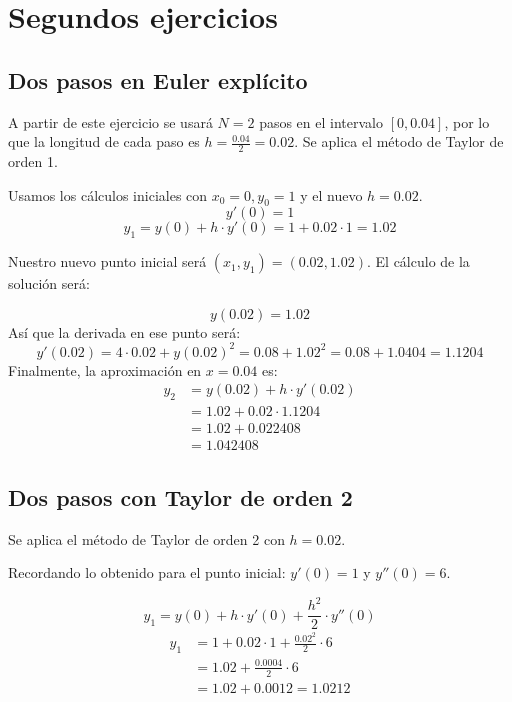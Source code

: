 \documentclass{article}
\begin{document}
\section{Segundos ejercicios}

\subsection{Dos pasos en Euler explícito}

A partir de este ejercicio se usará $N=2$ pasos en el intervalo $[0, 0.04]$, por lo que la longitud de cada paso es $h=\frac{0.04}{2}=0.02$. Se aplica el método de Taylor de orden 1.

Usamos los cálculos iniciales con $x_0=0, y_0=1$ y el nuevo $h=0.02$.
\begin{equation}
y'(0) = 1
\end{equation}
\begin{equation}
y_1 = y(0) + h \cdot y'(0) = 1 + 0.02 \cdot 1 = 1.02
\end{equation}

Nuestro nuevo punto inicial será $(x_1, y_1) = (0.02, 1.02)$. El cálculo de la solución será:


\begin{equation}
y(0.02) = 1.02
\end{equation}
Así que la derivada en ese punto será:
\begin{equation}
y'(0.02) = 4 \cdot 0.02 + y(0.02)^2 = 0.08 + 1.02^2 = 0.08 + 1.0404 = 1.1204
\end{equation}
Finalmente, la aproximación en $x=0.04$ es:
\begin{align*}
y_2 &= y(0.02) + h \cdot y'(0.02) \\
&= 1.02 + 0.02 \cdot 1.1204 \\
&= 1.02 + 0.022408 \\
&= \boxed{1.042408}
\end{align*}

\subsection{Dos pasos con Taylor de orden 2}
Se aplica el método de Taylor de orden 2 con $h=0.02$.

Recordando lo obtenido para el punto inicial: $y'(0)=1$ y $y''(0)=6$.

\begin{equation}
y_1 = y(0) + h \cdot y'(0) + \frac{h^2}{2} \cdot y''(0)
\end{equation}
\begin{align*}
y_1 &= 1 + 0.02 \cdot 1 + \frac{0.02^2}{2} \cdot 6 \\
&= 1.02 + \frac{0.0004}{2} \cdot 6 \\
&= 1.02 + 0.0012 = 1.0212
\end{align*}
\end{document}

